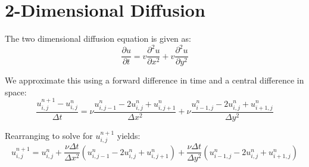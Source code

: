 \section{2-Dimensional Diffusion}


The two dimensional diffusion equation is given as:
\begin{equation}
  \frac{\partial u}{\partial t} = v\frac{\partial^2 u}{\partial x^2} + v\frac{\partial^2 u}{\partial y^2}  
\end{equation}

We approximate this using a forward difference in time and a central difference in space:
\begin{equation}
  \frac{u^{n+1}_{i, j} - u^{n}_{i, j}}{\Delta t} = \nu\frac{ u^{n}_{i, j-1} - 2  u^{n}_{i, j} +  u^{n}_{i, j+1}}{\Delta x^2} + \nu\frac{ u^{n}_{i-1, j} - 2  u^{n}_{i, j} +  u^{n}_{i+1, j}}{\Delta y^2}
\end{equation}

Rearranging to solve for $u^{n+1}_{i, j}$ yields:
\begin{equation}
u^{n+1}_{i, j} = u^{n}_{i, j} + \frac{\nu\Delta t}{\Delta x^2}(u^{n}_{i, j-1} - 2  u^{n}_{i, j} +  u^{n}_{i, j+1}) + \frac{\nu\Delta t}{\Delta y^2}(u^{n}_{i-1, j} - 2  u^{n}_{i, j} +  u^{n}_{i+1, j})
\end{equation}

